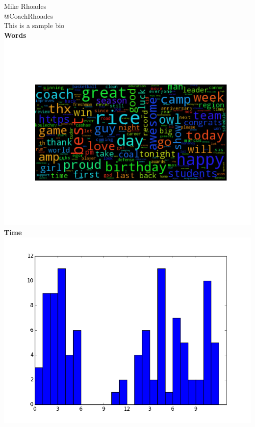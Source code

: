 \documentclass[12pt]{article}
\begin{document}
\huge \noindent Mike Rhoades\\
\large @CoachRhoades\\
\small This is a sample bio\\
\huge \textbf{Words}\\
\includegraphics[scale=.4, trim={0, 0, 0, 0}]{wordcloud.png}\\
\huge \textbf{Time}\\
\includegraphics[scale=.4, trim={0, 0, 0, 0}]{byTime.png}
\end{document}
